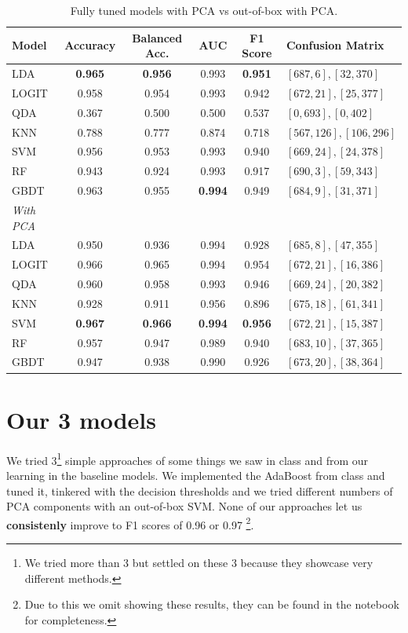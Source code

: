 \documentclass{article}
\begin{document}
\begin{table}[h]
    \centering
    \begin{tabular}{lSSSSl}
        \toprule
        {Model} & {Accuracy} & {Balanced Acc.} & {AUC} & {F1 Score} & {Confusion Matrix} \\
        \midrule
        LDA & \textbf{0.965} & \textbf{0.956} & 0.993 & \textbf{0.951} & \([687, 6], [32, 370]\) \\
        LOGIT & 0.958 & 0.954 & 0.993 & 0.942 & \([672, 21], [25, 377]\) \\
        QDA & 0.367 & 0.500 & 0.500 & 0.537 & \([0, 693], [0, 402]\) \\
        KNN & 0.788 & 0.777 & 0.874 & 0.718 & \([567, 126], [106, 296]\) \\
        SVM & 0.956 & 0.953 & 0.993 & 0.940 & \([669, 24], [24, 378]\) \\
        RF & 0.943 & 0.924 & 0.993 & 0.917 & \([690, 3], [59, 343]\) \\
        GBDT & 0.963 & 0.955 & \textbf{0.994} & 0.949 & \([684, 9], [31, 371]\) \\ \midrule
        \textit{With PCA} \\\midrule
        LDA & 0.950 & 0.936 & 0.994 & 0.928 & \([685, 8], [47, 355]\) \\
        LOGIT & 0.966 & 0.965 & 0.994 & 0.954 & \([672, 21], [16, 386]\) \\
        QDA & 0.960 & 0.958 & 0.993 & 0.946 & \([669, 24], [20, 382]\) \\
        KNN & 0.928 & 0.911 & 0.956 & 0.896 & \([675, 18], [61, 341]\) \\
        SVM & \textbf{0.967} & \textbf{0.966} & \textbf{0.994} & \textbf{0.956} & \([672, 21], [15, 387]\) \\
        RF & 0.957 & 0.947 & 0.989 & 0.940 & \([683, 10], [37, 365]\) \\
        GBDT & 0.947 & 0.938 & 0.990 & 0.926 & \([673, 20], [38, 364]\) \\
        \bottomrule
    \end{tabular}
    \caption{Fully tuned models with PCA vs out-of-box with PCA.}
    \label{tab:metrics}
\end{table}



\section{Our 3 models} \label{sec:1.3}
We tried 3\footnote{We tried more than 3 but settled on these 3 because they showcase very different methods.} simple approaches of some things
we saw in class and from our learning in the baseline models. We implemented the AdaBoost from class and tuned it, tinkered with the decision thresholds and we 
tried different numbers of PCA components with an out-of-box SVM. None of our approaches let us \textbf{consistenly} improve to F1 scores of 0.96 or 0.97
\footnote{Due to this we omit showing these results, they can be found in the notebook for completeness.}. 
\end{document}
